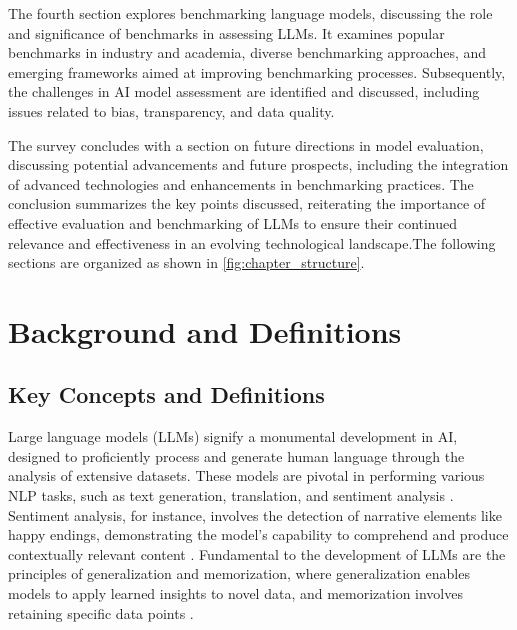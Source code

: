 The fourth section explores benchmarking language models, discussing the role and significance of benchmarks in assessing LLMs. It examines popular benchmarks in industry and academia, diverse benchmarking approaches, and emerging frameworks aimed at improving benchmarking processes. Subsequently, the challenges in AI model assessment are identified and discussed, including issues related to bias, transparency, and data quality.



The survey concludes with a section on future directions in model evaluation, discussing potential advancements and future prospects, including the integration of advanced technologies and enhancements in benchmarking practices. The conclusion summarizes the key points discussed, reiterating the importance of effective evaluation and benchmarking of LLMs to ensure their continued relevance and effectiveness in an evolving technological landscape.The following sections are organized as shown in \autoref{fig:chapter_structure}.







\section{Background and Definitions} \label{sec:Background and Definitions}



\subsection{Key Concepts and Definitions} \label{subsec:Key Concepts and Definitions}



Large language models (LLMs) signify a monumental development in AI, designed to proficiently process and generate human language through the analysis of extensive datasets. These models are pivotal in performing various NLP tasks, such as text generation, translation, and sentiment analysis \cite{lin2023humaneventslargescalebenchmark}. Sentiment analysis, for instance, involves the detection of narrative elements like happy endings, demonstrating the model's capability to comprehend and produce contextually relevant content \cite{jannidis2016analyzingfeaturesdetectionhappy}. Fundamental to the development of LLMs are the principles of generalization and memorization, where generalization enables models to apply learned insights to novel data, and memorization involves retaining specific data points .



